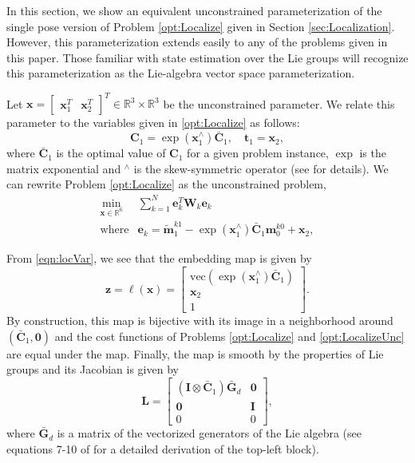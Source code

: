 \documentclass[lettersize,journal]{IEEEtran}
\newcommand{\vect}[1]{\mbox{vec}(#1)}
\begin{document}
{In this section, we show an equivalent unconstrained parameterization of the single pose version of Problem \ref{opt:Localize} given in Section \ref{sec:Localization}. However, this parameterization extends easily to any of the problems given in this paper. Those familiar with state estimation over the Lie groups will recognize this parameterization as the Lie-algebra vector space parameterization. 

Let $\bm{x}= \begin{bmatrix} \bm{x}_1^T & \bm{x}_2^T\end{bmatrix}^T \in \mathbb{R}^3\times\mathbb{R}^3$ be the unconstrained parameter. We relate this parameter to the variables given in \ref{opt:Localize} as follows:
\begin{equation}
	\bm{C}_1 = \exp(\bm{x}_1^\wedge)\bar{\bm{C}}_1, \quad \bm{t}_1 = \bm{x}_2,
\end{equation} 
where $\bar{\bm{C}}_1$ is the optimal value of $\bm{C}_1$ for a given problem instance, $\exp$ is the matrix exponential and $^\wedge$ is the skew-symmetric operator (see \cite{barfoot2011state} for details). We can rewrite Problem \ref{opt:Localize} as the unconstrained problem,
\begin{equation}
	\label{opt:LocalizeUnc}
	\begin{array}{rl}
		\min\limits_{\bm{x} \in \mathbb{R}^6} &\sum\limits_{k=1}^N \bm{e}_{k}^T \bm{W}_{k} \bm{e}_{k} \\
		\mbox{where} & \bm{e}_{k} = \tilde{\bm{m}}_1^{k1} - \exp(\bm{x}_1^\wedge)\bar{\bm{C}}_1\bm{m}_0^{k0} + \bm{x}_2,
	\end{array}
\end{equation}

From \eqref{eqn:locVar}, we see that the embedding map is given by
\begin{equation}
	\bm{z}=\bm{\ell}(\bm{x}) = \begin{bmatrix}
		\vect{\exp(\bm{x}_1^\wedge)\bar{\bm{C}}_1}\\ \bm{x}_2 \\ 1
	\end{bmatrix}.
\end{equation}
By construction, this map is bijective with its image in a neighborhood around $(\bar{\bm{C}}_1, \bm{0})$ and the cost functions of Problems \ref{opt:Localize} and \ref{opt:LocalizeUnc} are equal under the map. Finally, the map is smooth by the properties of Lie groups and its Jacobian is given by
\begin{equation}
	\bm{L} = \begin{bmatrix}
		(\bm{I}\otimes\bar{\bm{C}}_1) \bar{\bm{G}}_d & \bm{0}\\
		\bm{0} & \bm{I}\\
		0 & 0
	\end{bmatrix},
\end{equation}
where $\bar{\bm{G}}_d$ is a matrix of the vectorized generators of the Lie algebra (see equations 7-10 of \cite{dellaertShonanRotationAveraging2020} for a detailed derivation of the top-left block).

}
\end{document}
